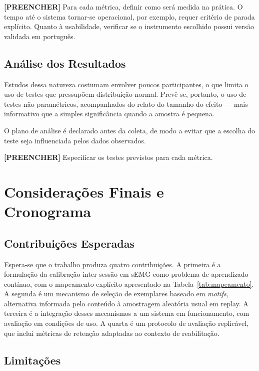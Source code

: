 \textbf{[PREENCHER]} Para cada métrica, definir como será medida na
prática. O tempo até o sistema tornar-se operacional, por exemplo,
requer critério de parada explícito. Quanto à usabilidade, verificar se
o instrumento escolhido possui versão validada em português.

\subsection{Análise dos Resultados}

Estudos dessa natureza costumam envolver poucos participantes, o que
limita o uso de testes que pressupõem distribuição normal. Prevê-se,
portanto, o uso de testes não paramétricos, acompanhados do relato do
tamanho do efeito --- mais informativo que a simples significância
quando a amostra é pequena.

O plano de análise é declarado antes da coleta, de modo a evitar que a
escolha do teste seja influenciada pelos dados observados.

\textbf{[PREENCHER]} Especificar os testes previstos para cada métrica.

\section{Considerações Finais e Cronograma}

\subsection{Contribuições Esperadas}

Espera-se que o trabalho produza quatro contribuições. A primeira é a
formulação da calibração inter-sessão em sEMG como problema de
aprendizado contínuo, com o mapeamento explícito apresentado na
Tabela~\ref{tab:mapeamento}. A segunda é um mecanismo de seleção de
exemplares baseado em \textit{motifs}, alternativa informada pelo
conteúdo à amostragem aleatória usual em replay. A terceira é a
integração desses mecanismos a um sistema em funcionamento, com
avaliação em condições de uso. A quarta é um protocolo de avaliação
replicável, que inclui métricas de retenção adaptadas ao contexto de
reabilitação.

\subsection{Limitações}

